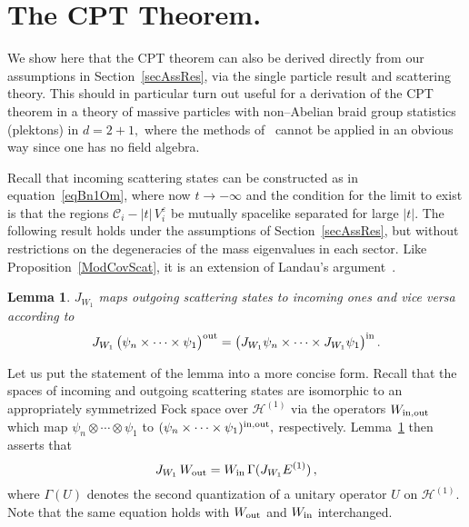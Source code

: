 \documentclass[a4paper,reqno,11pt]{amsart}
\theoremstyle{plain}
\newtheorem{Lem}[Thm]{Lemma}
\theoremstyle{definition}
\numberwithin{equation}{section}
\newcommand{\calH}{{\mathcal H}}
\newcommand{\calC}{{\mathcal C}}
\newcommand{\He}{\calH^{(1)}}
\newcommand{\eps}{\varepsilon}
\newcommand{\Out}{{\rm out} }
\newcommand{\In}{{\rm in} }
\newcommand{\JWR}{J_{W_1}}  %
\newcommand{\Ee}{E^{(1)}}
\newcommand{\cone}{\calC}   %
\begin{document}
\section{The CPT Theorem.} \label{secCPT}
We show here that the CPT theorem can also be derived directly   
from our assumptions in Section~\ref{secAssRes}, 
via the single particle result and scattering theory. This should in
particular turn out useful for a derivation of the CPT theorem in a 
theory of massive particles with non--Abelian braid group statistics
(plektons) in $d=2+1,$ where the methods of~\cite{GL} cannot be
applied in an obvious way since one has no field algebra. 

Recall that incoming scattering states can be constructed as in
equation~\eqref{eqBn1Om}, where now $t\rightarrow -\infty$ and the
condition for the limit to exist is that the regions 
$\cone_i-|t|\,V_i^\eps$ be 
mutually spacelike separated for large $|t|$. The following
result 
holds under the assumptions of Section~\ref{secAssRes}, but without 
restrictions on the degeneracies of the mass eigenvalues in each
sector. 
Like Proposition~\ref{ModCovScat}, it is an extension of Landau's
argument~\cite{Landau}. 
\begin{Lem} \label{JScat}
$\JWR$ maps outgoing scattering states to incoming ones and vice versa
according to 
\begin{equation} \label{eqJScat}
\JWR\,\big(\psi_n\times\cdots\times\psi_1\big)^{\Out}=
\big(\JWR\psi_n\times\cdots\times\JWR\psi_1\big)^{\In} \,. 
\end{equation}
\end{Lem}
Let us put the statement of the lemma into a more concise form. 
Recall that the spaces of incoming and outgoing scattering
states are isomorphic to an appropriately symmetrized Fock space over
$\He$ via the operators $W_{\In,\Out}$ which map 
$\psi_n\otimes\cdots\otimes\psi_1$ to 
$(\psi_n\times\cdots\times\psi_1)^{\In,\Out},$ respectively. 
 Lemma~\ref{JScat} then asserts that 
\begin{equation}  \label{eqJS}
 \JWR\,W_{\Out}=W_{\In}\, \Gamma(\JWR\Ee)\,,
\end{equation}
where $\Gamma(U)$ denotes the second quantization of a unitary operator $U$
on $\He.$  
Note that the same equation holds with $W_ {\Out}$ and
$W_{\In}$ interchanged. 
\end{document}
